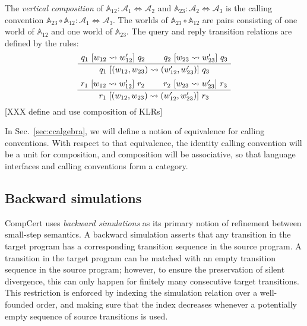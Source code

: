 \begin{definition}
The \emph{vertical composition} of
$\mathbb{A}_{12} : \mathcal{A}_1 \Leftrightarrow \mathcal{A}_2$ and
$\mathbb{A}_{23} : \mathcal{A}_2 \Leftrightarrow \mathcal{A}_3$
is the calling convention
$\mathbb{A}_{23} \circ \mathbb{A}_{12} :
 \mathcal{A}_1 \Leftrightarrow \mathcal{A}_3$.
The worlds of $\mathbb{A}_{23} \circ \mathbb{A}_{12}$
are pairs consisting of
one world of $\mathbb{A}_{12}$ and
one world of $\mathbb{A}_{23}$.
The query and reply transition relations are defined
by the rules:
\[
  \AxiomC{$q_1 \ifr{w_{12} \leadsto w_{12}'} q_2$}
  \AxiomC{$q_2 \ifr{w_{23} \leadsto w_{23}'} q_3$}
  \BinaryInfC{$q_1 \ifr{(w_{12}, w_{23}) \leadsto (w_{12}', w_{23}')} q_3$}
  \DisplayProof
\]
\[
  \AxiomC{$r_1 \ifr{w_{12} \leadsto w_{12}'} r_2$}
  \AxiomC{$r_2 \ifr{w_{23} \leadsto w_{23}'} r_3$}
  \BinaryInfC{$r_1 \ifr{(w_{12}, w_{23}) \leadsto (w_{12}', w_{23}')} r_3$}
  \DisplayProof
\]
[XXX define and use composition of KLRs]
\end{definition}

In Sec.~\ref{sec:ccalgebra},
we will define a notion of equivalence for calling conventions.
With respect to that equivalence,
the identity calling convention will be a unit for composition,
and composition will be associative,
so that language interfaces and calling conventions
form a category.


\subsection{Backward simulations} %

CompCert uses \emph{backward simulations}
as its primary notion of refinement between small-step semantics.
A backward simulation asserts that any transition in the target program
has a corresponding transition sequence in the source program.
A transition in the target program can be matched with
an empty transition sequence in the source program;
however, to ensure the preservation of silent divergence,
this can only happen for finitely many consecutive target transitions.
This restriction is enforced by indexing the simulation relation
over a well-founded order,
and making sure that the index decreases
whenever a potentially empty sequence of source transitions is used.

